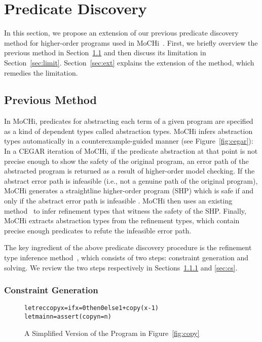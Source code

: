 

\section{Predicate Discovery}
\label{sec:refine}

In this section, we propose an extension of our previous predicate 
discovery method for higher-order programs used in 
MoCHi~\cite{KobayashiPLDI2011}.  First, we briefly overview the previous 
method in Section~\ref{sec:prev} and then discuss its limitation in 
Section~\ref{sec:limit}. Section~\ref{sec:ext} explains the extension of 
the method, which remedies the limitation.

\subsection{Previous Method}
\label{sec:prev}

In MoCHi, predicates for abstracting each term of a given program are 
specified as a kind of dependent types called abstraction types.  MoCHi 
infers abstraction types automatically in a counterexample-guided manner 
(see Figure~\ref{fig:cegar}): In a CEGAR iteration of MoCHi, if the 
predicate abstraction at that point is not precise enough to show the 
safety of the original program, an error path of the abstracted program 
is returned as a result of higher-order model checking.  If the abstract 
error path is infeasible (i.e., not a genuine path of the original 
program), MoCHi generates a straightline higher-order program (SHP) 
which is safe if and only if the abstract error path is infeasible . 
MoCHi then uses an existing method~\cite{Unno2009} to infer refinement 
types that witness the safety of the SHP.  Finally, MoCHi extracts 
abstraction types from the refinement types, which contain precise 
enough predicates to refute the infeasible error path.

The key ingredient of the above predicate discovery procedure is the 
refinement type inference 
method~\cite{Unno2009,Terauchi2010,KobayashiPLDI2011}, which consists of 
two steps: constraint generation and solving.  We review the two steps 
respectively in Sections~\ref{sec:cg} and \ref{sec:cs}.

\subsubsection{Constraint Generation}
\label{sec:cg}

\begin{figure}[t]
\begin{alltt}
let rec copy x = if x=0 then 0 else 1 + copy (x-1)
let main n = assert (copy n = n)
\end{alltt}
\caption{A Simplified Version of the Program in Figure~\ref{fig:copy}}
\label{fig:copy2}
\end{figure}

